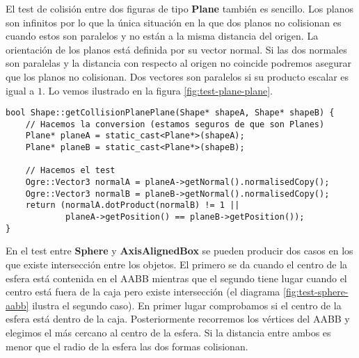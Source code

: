 El test de colisión entre dos figuras de tipo \textbf{Plane} también es
sencillo. Los planos son infinitos por lo que la única situación en la
que dos planos no colisionan es cuando estos son paralelos y no están a 
la misma distancia del origen. La orientación de los planos está definida
por su vector normal. Si las dos normales son paralelas y la distancia
con respecto al origen no coincide podremos asegurar que los planos no
colisionan. Dos vectores son paralelos si su producto escalar es igual a $1$.
Lo vemos ilustrado en la figura \ref{fig:test-plane-plane}.\\
 

\begin{lstlisting}[style=C++]
bool Shape::getCollisionPlanePlane(Shape* shapeA, Shape* shapeB) {
    // Hacemos la conversion (estamos seguros de que son Planes)
    Plane* planeA = static_cast<Plane*>(shapeA);
    Plane* planeB = static_cast<Plane*>(shapeB);

    // Hacemos el test
    Ogre::Vector3 normalA = planeA->getNormal().normalisedCopy();
    Ogre::Vector3 normalB = planeB->getNormal().normalisedCopy();
    return (normalA.dotProduct(normalB) != 1 ||
            planeA->getPosition() == planeB->getPosition());
}

\end{lstlisting}

En el test entre \textbf{Sphere} y \textbf{AxisAlignedBox} se pueden
producir dos casos en los que existe intersección entre los objetos.
El primero se da cuando el centro de la esfera está contenida en el AABB
mientras que el segundo tiene lugar cuando el centro está fuera de la caja
pero existe intersección (el diagrama \ref{fig:test-sphere-aabb} ilustra
el segundo caso). En primer lugar comprobamos si el centro de la esfera
está dentro de la caja. Posteriormente recorremos los vértices del AABB
y elegimos el más cercano al centro de la esfera. Si la distancia entre
ambos es menor que el radio de la esfera las dos formas colisionan.



